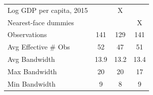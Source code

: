 \begin{adjustbox}{max width=\textwidth}
\begin{tabular}{l*{3}{r@{\hspace{3pt}}l}}
\midrule Log GDP per capita, 2015&\multicolumn{2}{c}{}&\multicolumn{2}{c}{X}&\multicolumn{2}{c}{}\\
Nearest-face dummies&\multicolumn{2}{c}{}&\multicolumn{2}{c}{}&\multicolumn{2}{c}{X}\\
Observations&\multicolumn{2}{c}{141}&\multicolumn{2}{c}{129}&\multicolumn{2}{c}{141}\\
Avg Effective \# Obs&\multicolumn{2}{c}{52}&\multicolumn{2}{c}{47}&\multicolumn{2}{c}{51}\\
Avg Bandwidth&\multicolumn{2}{c}{13.9}&\multicolumn{2}{c}{13.2}&\multicolumn{2}{c}{13.4}\\
Max Bandwidth&\multicolumn{2}{c}{20}&\multicolumn{2}{c}{20}&\multicolumn{2}{c}{17}\\
Min Bandwidth&\multicolumn{2}{c}{9}&\multicolumn{2}{c}{8}&\multicolumn{2}{c}{9}\\
\bottomrule
\end{tabular}
\end{adjustbox}
